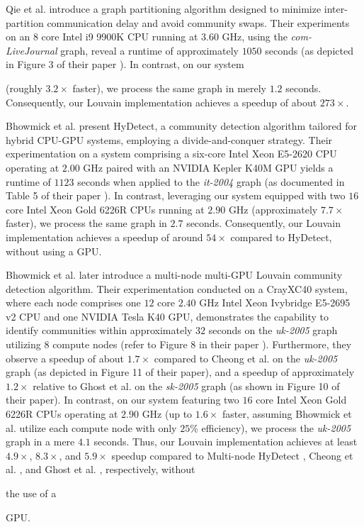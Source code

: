 Qie et al. \cite{qie2022isolate} introduce a graph partitioning algorithm designed to minimize inter-partition communication delay and avoid community swaps. Their experiments on an $8$ core Intel i9 9900K CPU running at $3.60$ GHz, using the \textit{com-LiveJournal} graph, reveal a runtime of approximately $1050$ seconds (as depicted in Figure 3 of their paper \cite{qie2022isolate}). In contrast, on our system (roughly $3.2\times$ faster), we process the same graph in merely $1.2$ seconds. Consequently, our Louvain implementation achieves a speedup of about $273\times$.

Bhowmick et al. \cite{com-bhowmik19} present HyDetect, a community detection algorithm tailored for hybrid CPU-GPU systems, employing a divide-and-conquer strategy. Their experimentation on a system comprising a six-core Intel Xeon E5-2620 CPU operating at $2.00$ GHz paired with an NVIDIA Kepler K40M GPU yields a runtime of $1123$ seconds when applied to the \textit{it-2004} graph (as documented in Table 5 of their paper \cite{com-bhowmik19}). In contrast, leveraging our system equipped with two $16$ core Intel Xeon Gold 6226R CPUs running at $2.90$ GHz (approximately $7.7\times$ faster), we process the same graph in $2.7$ seconds. Consequently, our Louvain implementation achieves a speedup of around $54\times$ compared to HyDetect, without using a GPU.

Bhowmick et al. \cite{com-bhowmick22} later introduce a multi-node multi-GPU Louvain community detection algorithm. Their experimentation conducted on a CrayXC40 system, where each node comprises one $12$ core $2.40$ GHz Intel Xeon Ivybridge E5-2695 v2 CPU and one NVIDIA Tesla K40 GPU, demonstrates the capability to identify communities within approximately $32$ seconds on the \textit{uk-2005} graph utilizing $8$ compute nodes (refer to Figure 8 in their paper \cite{com-bhowmick22}). Furthermore, they observe a speedup of about $1.7\times$ compared to Cheong et al. \cite{com-cheong13} on the \textit{uk-2005} graph (as depicted in Figure 11 of their paper), and a speedup of approximately $1.2\times$ relative to Ghost et al. \cite{com-ghosh18} on the \textit{sk-2005} graph (as shown in Figure 10 of their paper). In contrast, on our system featuring two $16$ core Intel Xeon Gold 6226R CPUs operating at $2.90$ GHz (up to $1.6\times$ faster, assuming Bhowmick et al. utilize each compute node with only $25\%$ efficiency), we process the \textit{uk-2005} graph in a mere $4.1$ seconds. Thus, our Louvain implementation achieves at least $4.9\times$, $8.3\times$, and $5.9\times$ speedup compared to Multi-node HyDetect \cite{com-bhowmick22}, Cheong et al. \cite{com-cheong13}, and Ghost et al. \cite{com-ghosh18}, respectively, without the use of a GPU.

